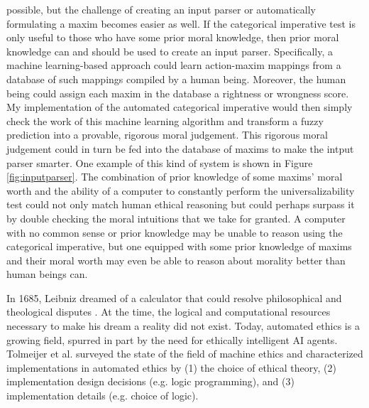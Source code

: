 \begin{isabellebody}
\begin{isamarkuptext}
possible, but the challenge of creating an input parser or automatically formulating a maxim becomes 
easier as well. 
If the categorical imperative test is only useful to those who have some prior moral knowledge, then prior moral
knowledge can and should be used to create an input parser. Specifically, a machine learning-based approach
could learn action-maxim mappings from a database of such mappings compiled by a human being. Moreover, 
the human being could assign each maxim in the database a rightness or wrongness score. My implementation
of the automated categorical imperative would then simply check the work of this machine learning algorithm and transform
a fuzzy prediction into a provable, rigorous moral judgement. This rigorous moral judgement
could in turn be fed into the database of maxims to make the intput parser smarter. One example of 
this kind of system is shown in Figure \ref{fig:inputparser}. The combination of 
prior knowledge of some maxims' moral worth and the ability of a computer to constantly perform the
universalizability test could not only match human ethical reasoning but could perhaps surpass it
by double checking the moral intuitions that we take for granted. A computer with no common sense or prior knowledge
may be unable to reason using the categorical imperative, but one equipped with some prior knowledge
of maxims and their moral worth may even be able to reason about morality better than human beings can.%
\end{isamarkuptext}\isamarkuptrue%
%
\isadelimdocument
%
\endisadelimdocument
%
\isatagdocument
%
\isamarkuptrue%
%
\endisatagdocument
{\isafolddocument}%
%
\isadelimdocument
%
\endisadelimdocument
%
\begin{isamarkuptext}%
In 1685, Leibniz dreamed of a calculator that could resolve philosophical and theological 
disputes \citep{leibniz}. At the time, the logical and computational resources necessary to make his 
dream a reality did not exist. Today, automated ethics is a growing field, spurred in part by the 
need for ethically intelligent AI agents. Tolmeijer et al. surveyed the state of the field of 
machine ethics \citep{mesurvey} and characterized implementations in automated ethics by (1) the choice 
of ethical theory, (2) implementation design decisions (e.g. logic programming), and (3) implementation 
details (e.g. choice of logic). 


\end{isamarkuptext}
\end{isabellebody}
